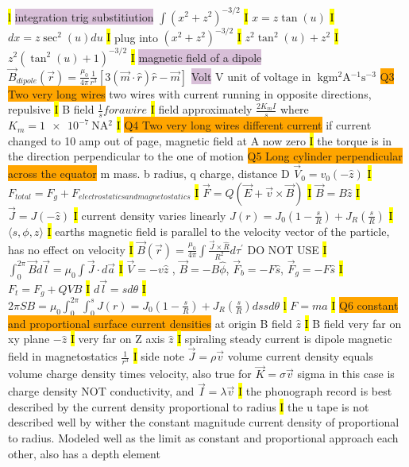 \documentclass[fontsize=4pt]{scrartcl}
\begin{document}
\hl{l}
\colorbox{Thistle}{integration trig substitiution}
$\int (x^2 + z^2)^{-3/2}$
\hl{I}
$x=z\tan(u)$
\hl{I}
$dx = z\sec^2(u) du$
\hl{I}
plug into $(x^2 + z^2)^{-3/2}$
\hl{I}
$z^2 \tan^2(u) + z^2$
\hl{I}
$z^2(\tan^2(u) + 1)^{-3/2}$
\hl{I}
\colorbox{Thistle}{magnetic field of a dipole}
$\vec{B}_{dipole}(\vec{r}) = \frac{\mu_0}{4\pi}\frac{1}{r^3}[3(\vec{m} \cdot \hat{r})\hat{r} - \vec{m}]$
\colorbox{Thistle}{Volt} V unit of voltage in $\SI{}{ \kilogram \meter^2 \ampere^{-1} \second ^{-3}}$
\colorbox{Orange}{Q3 Two very long wires}
two wires with current running in opposite directions, repulsive
\hl{I}
B field $\frac{1}{s} for a wire$
\hl{I}
field approximately $\frac{2 K_m I}{s}$ where $K_m = \SI{1e-7}{\newton \ampere^{2}}$
\hl{I}
\colorbox{Orange}{Q4 Two very long wires different current}
if current changed to 10 amp out of page, magnetic field at A now zero
\hl{I}
the torque is in the direction perpendicular to the one of motion
\colorbox{Orange}{Q5 Long cylinder perpendicular across the equator}
m mass. b radius, q charge, distance D $\vec{V}_0 = v_0(-\hat{z})$ 
\hl{I}
$F_{total} = F_g + F_{electrostatics and magnetostatics}$
\hl{I}
$\vec{F} = Q(\vec{E} + \vec{v} \times \vec{B})$
\hl{I}
$\vec{B} = B\hat{z}$
\hl{I}
$\vec{J} = J(-\hat{z})$
\hl{I}
current density varies linearly $J(r) = J_0(1-\frac{s}{R})+J_R(\frac{s}{R})$ 
\hl{I}
$\langle s,\phi,z \rangle$
\hl{I}
earths magnetic field is parallel to the velocity vector of the particle, has no effect on velocity
\hl{I}
$\vec{B}(\vec{r}) = \frac{\mu_0}{4\pi} \int \frac{\vec{J} \times \hat{R}}{R^2} d\tau^{\prime} $ DO NOT USE
\hl{I}
$\int_0^{2\pi} \vec{B} d\vec{l} = \mu_0 \int \vec{J} \cdot d\vec{a}$
\hl{I}
$\vec{V} = -v\hat{z}$ , $\vec{B}=-B\hat{\phi}$, $\vec{F}_b=-F\hat{s}$, $\vec{F}_g = -F\hat{s}$
\hl{I}
$F_t = F_g + QVB$
\hl{I}
$d\vec{l} = sd\theta$
\hl{I}
$2\pi S B = \mu_0 \int_{0}^{2\pi} \int_0^{s} J(r) = J_0(1-\frac{s}{R})+J_R(\frac{s}{R}) ds s d\theta$ 
\hl{l}
$F=ma$
\hl{I}
\colorbox{Orange}{Q6 constant and proportional surface current densities}
at origin B field $\hat{z}$
\hl{I}
B field very far on xy plane $-\hat{z}$
\hl{I}
very far on Z axis $\hat{z}$
\hl{I}
spiraling steady current is dipole magnetic field in magnetostatics $\frac{1}{r^3}$ 
\hl{I}
side note $\vec{J} = \rho \vec{v}$ volume current density equals volume charge density times velocity, also true for $\vec{K} = \sigma \vec{v}$ sigma in this case is charge density NOT  conductivity, and $\vec{I} = \lambda \vec{v}$
\hl{I}
the phonograph record is best described by the current density proportional to radius
\hl{I}
the u tape is not described well by wither the constant magnitude current density of proportional to radius. Modeled well as the limit as constant and proportional approach each other, also has a depth element
\end{document}
